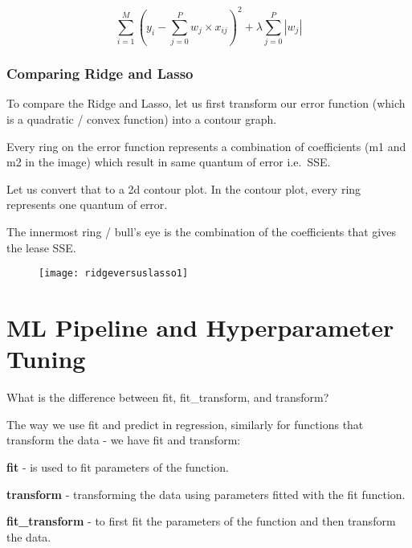 	\begin{equation}
		\sum^M_{i=1} \left(y_i - \sum^P_{j=0} w_j \times x_{ij} \right)^2  +  \lambda \sum^P_{j=0} \left| w_j \right|
	\end{equation}

	\subsection{Comparing Ridge and Lasso}
To compare the Ridge and Lasso, let us first transform our error function (which is a quadratic / convex function) into a contour graph.

	\begin{bulletedlist}
		\item Every ring on the error function represents a combination of coefficients (m1 and m2 in the image) which result in same quantum of error i.e.\ SSE.
		\item Let us convert that to a 2d contour plot.  In the contour plot, every ring represents one quantum of error.
		\item The innermost ring / bull's eye is the combination of the coefficients that gives the lease SSE.
	\end{bulletedlist}

	\begin{figure}[tbh]
		\centering
		\texttt{[image: ridgeversuslasso1]}
		\caption{}
		\label{fig:ridgeversuslasso1}
	\end{figure}


	\chapter{ML Pipeline and Hyperparameter Tuning}


	\resetquestioncounter{}
	\begin{qanda}
		\begin{question}
What is the difference between fit, fit\_transform, and transform?
		\end{question}

		\begin{answer}
The way we use fit and predict in regression, similarly for functions that transform the data - we have fit and transform:

\textbf{fit} - is used to fit parameters of the function.

\textbf{transform} - transforming the data using parameters fitted with the fit function.

\textbf{fit\_transform} - to first fit the parameters of the function and then transform the data.
		\end{answer}
	\end{qanda}

